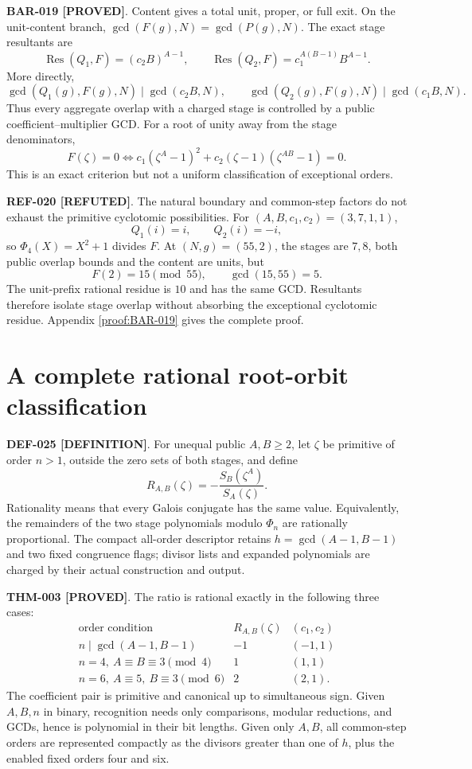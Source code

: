 \documentclass[11pt]{article}
\newcommand{\claimstatus}[2]{\textbf{#1 [#2]}}
\begin{document}
\claimstatus{BAR-019}{PROVED}. Content gives a total unit, proper, or full
exit. On the unit-content branch,
\(\gcd(F(g),N)=\gcd(P(g),N)\). The exact stage resultants are
\[
\operatorname{Res}(Q_1,F)=(c_2B)^{A-1},\qquad
\operatorname{Res}(Q_2,F)=c_1^{A(B-1)}B^{A-1}.
\]
More directly,
\[
\gcd(Q_1(g),F(g),N)\mid\gcd(c_2B,N),\qquad
\gcd(Q_2(g),F(g),N)\mid\gcd(c_1B,N).
\]
Thus every aggregate overlap with a charged stage is controlled by a public
coefficient--multiplier GCD. For a root of unity away from the stage
denominators,
\[
F(\zeta)=0
\iff c_1(\zeta^A-1)^2+
c_2(\zeta-1)(\zeta^{AB}-1)=0.
\]
This is an exact criterion but not a uniform classification of exceptional
orders.

\claimstatus{REF-020}{REFUTED}. The natural boundary and common-step factors
do not exhaust the primitive cyclotomic possibilities. For
\((A,B,c_1,c_2)=(3,7,1,1)\),
\[
Q_1(i)=i,\qquad Q_2(i)=-i,
\]
so \(\Phi_4(X)=X^2+1\) divides \(F\). At
\((N,g)=(55,2)\), the stages are \(7,8\), both public overlap bounds and the
content are units, but
\[
F(2)=15\pmod {55},\qquad \gcd(15,55)=5.
\]
The unit-prefix rational residue is \(10\) and has the same GCD. Resultants
therefore isolate stage overlap without absorbing the exceptional
cyclotomic residue. Appendix \ref{proof:BAR-019} gives the complete proof.

\section{A complete rational root-orbit classification}

\claimstatus{DEF-025}{DEFINITION}. For unequal public \(A,B\ge2\), let
\(\zeta\) be primitive of order \(n>1\), outside the zero sets of both
stages, and define
\[
R_{A,B}(\zeta)=-\frac{S_B(\zeta^A)}{S_A(\zeta)}.
\]
Rationality means that every Galois conjugate has the same value. Equivalently,
the remainders of the two stage polynomials modulo \(\Phi_n\) are rationally
proportional. The compact all-order descriptor retains
\(h=\gcd(A-1,B-1)\) and two fixed congruence flags; divisor lists and expanded
polynomials are charged by their actual construction and output.

\claimstatus{THM-003}{PROVED}. The ratio is rational exactly in the following
three cases:
\[
\begin{array}{c|c|c}
\text{order condition} & R_{A,B}(\zeta) & (c_1,c_2)\\
\hline
n\mid\gcd(A-1,B-1) & -1 & (-1,1)\\
n=4,\ A\equiv B\equiv3\pmod4 & 1 & (1,1)\\
n=6,\ A\equiv5,\ B\equiv3\pmod6 & 2 & (2,1).
\end{array}
\]
The coefficient pair is primitive and canonical up to simultaneous sign.
Given \(A,B,n\) in binary, recognition needs only comparisons, modular
reductions, and GCDs, hence is polynomial in their bit lengths. Given only
\(A,B\), all common-step orders are represented compactly as the divisors
greater than one of \(h\), plus the enabled fixed orders four and six.
\end{document}
